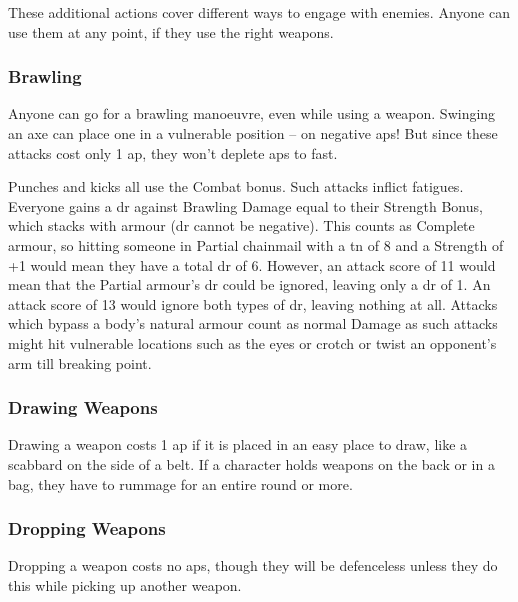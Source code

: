 \begin{multicols}{2}
These additional actions cover different ways to engage with enemies.
Anyone can use them at any point, if they use the right weapons.

\subsubsection[Brawling: Make a normal attack roll, but any attack with a Margin less than 5 only inflicts \glspl{fatigue} rather than Damage]{Brawling}

Anyone can go for a brawling manoeuvre, even while using a weapon.
Swinging an axe can place one in a vulnerable position -- on negative \glspl{ap}!
But since these attacks cost only 1 \gls{ap}, they won't deplete \glspl{ap} to fast.

Punches and kicks all use the Combat bonus.
Such attacks inflict \glspl{fatigue}.
Everyone gains a \gls{dr} against Brawling Damage equal to their Strength Bonus, which stacks with armour (\gls{dr} cannot be negative).
This counts as Complete armour, so hitting someone in Partial chainmail with a \gls{tn} of 8 and a Strength of +1 would mean they have a total \gls{dr} of 6.
However, an attack score of 11 would mean that the Partial armour's \gls{dr} could be ignored, leaving only a \gls{dr} of 1.
An attack score of 13 would ignore both types of \gls{dr}, leaving nothing at all.
Attacks which bypass a body's natural armour count as normal Damage as such attacks might hit vulnerable locations such as the eyes or crotch or twist an opponent's arm till breaking point.

\subsubsection[Drawing Weapon -- Cost: 1 \glsentrytext{ap}]{Drawing Weapons}

Drawing a weapon costs 1 \gls{ap} if it is placed in an easy place to draw, like a scabbard on the side of a belt.
If a character holds weapons on the back or in a bag, they have to rummage for an entire round or more.

\subsubsection[Dropping Weapon -- Cost: 0 \gls{ap}]{Dropping Weapons}

Dropping a weapon costs no \glspl{ap}, though they will be defenceless unless they do this while picking up another weapon.


\end{multicols}
